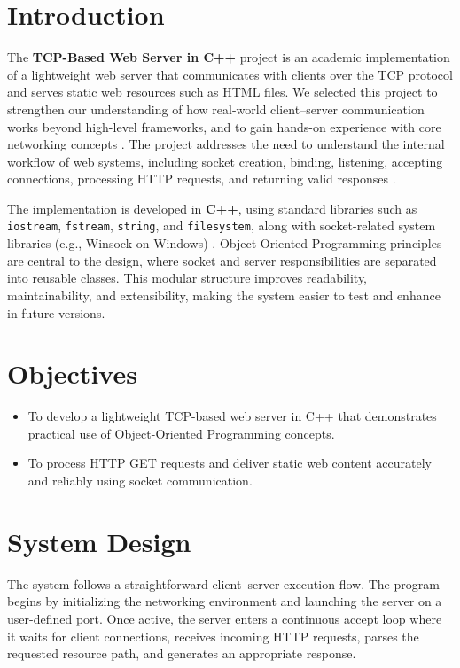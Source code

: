 \documentclass[11pt,a4paper]{article}
\begin{document}
\clearpage
{}
\setcounter{page}{1}

\section{Introduction}
The \textbf{TCP-Based Web Server in C++} project is an academic implementation of a lightweight web server that communicates with clients over the TCP protocol and serves static web resources such as HTML files. We selected this project to strengthen our understanding of how real-world client--server communication works beyond high-level frameworks, and to gain hands-on experience with core networking concepts \cite{stevens-unp}. The project addresses the need to understand the internal workflow of web systems, including socket creation, binding, listening, accepting connections, processing HTTP requests, and returning valid responses \cite{beej}.

The implementation is developed in \textbf{C++}, using standard libraries such as \texttt{iostream}, \texttt{fstream}, \texttt{string}, and \texttt{filesystem}, along with socket-related system libraries (e.g., Winsock on Windows) \cite{msdn-winsock}. Object-Oriented Programming principles are central to the design, where socket and server responsibilities are separated into reusable classes. This modular structure improves readability, maintainability, and extensibility, making the system easier to test and enhance in future versions.

\section{Objectives}
\begin{itemize}
    \item To develop a lightweight TCP-based web server in C++ that demonstrates practical use of Object-Oriented Programming concepts.
    \item To process HTTP GET requests and deliver static web content accurately and reliably using socket communication.
\end{itemize}

\section{System Design}
The system follows a straightforward client--server execution flow. The program begins by initializing the networking environment and launching the server on a user-defined port. Once active, the server enters a continuous accept loop where it waits for client connections, receives incoming HTTP requests, parses the requested resource path, and generates an appropriate response.
\end{document}
